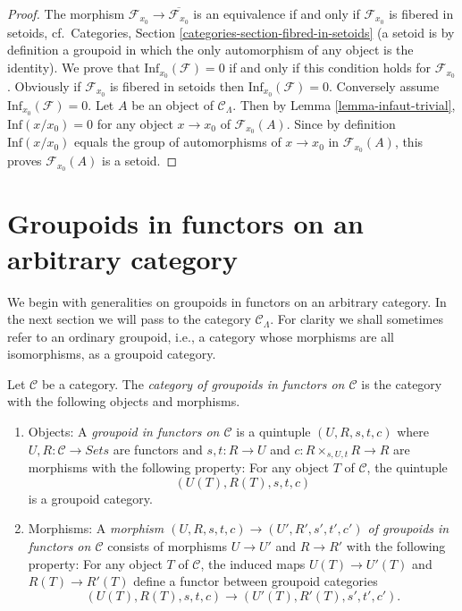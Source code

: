 \begin{proof}
The morphism $\mathcal{F}_{x_0} \to \overline{\mathcal{F}_{x_0}}$ is an
equivalence if and only if $\mathcal{F}_{x_0}$ is fibered in setoids,
cf.\ Categories, Section \ref{categories-section-fibred-in-setoids}
(a setoid is by definition a groupoid in
which the only automorphism of any object is the identity). We prove that
$\text{Inf}_{x_0}(\mathcal{F}) = 0$ if and only if this condition holds
for $\mathcal{F}_{x_0}$.  Obviously if $\mathcal{F}_{x_0}$ is fibered in
setoids then $\text{Inf}_{x_0}(\mathcal{F}) = 0$.  Conversely assume
$\text{Inf}_{x_0}(\mathcal{F}) = 0$.  Let $A$ be an object of
$\mathcal{C}_\Lambda$. Then by
Lemma \ref{lemma-infaut-trivial}, 
$\text{Inf}(x/x_0) = 0$ for any object $x \to x_0$ of
$\mathcal{F}_{x_0}(A)$. Since by definition $\text{Inf}(x/x_0)$
equals the group of automorphisms of $x \to x_0$ in $\mathcal{F}_{x_0}(A)$,
this proves $\mathcal{F}_{x_0}(A)$ is a setoid.
\end{proof}






\section{Groupoids in functors on an arbitrary category}
\label{section-groupoids-arbitrary}

\noindent
We begin with generalities on groupoids in functors on an
arbitrary category. In the next section we will
pass to the category $\mathcal{C}_\Lambda$.
For clarity we shall sometimes refer to an ordinary groupoid,
i.e., a category whose morphisms are all isomorphisms, as a groupoid category.

\begin{definition}
\label{definition-groupoid-in-functors}
Let $\mathcal{C}$ be a category. The
{\it category of groupoids in functors on $\mathcal{C}$}
is the category with the following objects and morphisms.
\begin{enumerate}
\item Objects: A {\it groupoid in functors on $\mathcal{C}$} is a quintuple 
$(U, R, s, t, c)$ where $U, R : \mathcal{C} \to \textit{Sets}$ are
functors and $s, t : R \to U$ and $c : R \times_{s, U, t} R \to R$
are morphisms with the following property: For any object $T$ of $\mathcal{C}$, 
the quintuple
$$
(U(T), R(T), s, t, c)
$$
is a groupoid category.
\item Morphisms: A {\it morphism $(U, R, s, t, c) \to (U', R', s', t', c')$ of
groupoids in functors on $\mathcal{C}$} consists of morphisms $U \to U'$ 
and $R \to R'$ with the following property: For any object $T$ of 
$\mathcal{C}$, the induced maps $U(T) \to U'(T)$ and
$R(T) \to R'(T)$ define a functor between groupoid categories
$$
(U(T), R(T), s, t, c) \to (U'(T), R'(T), s', t', c').
$$ 
\end{enumerate}
\end{definition}


